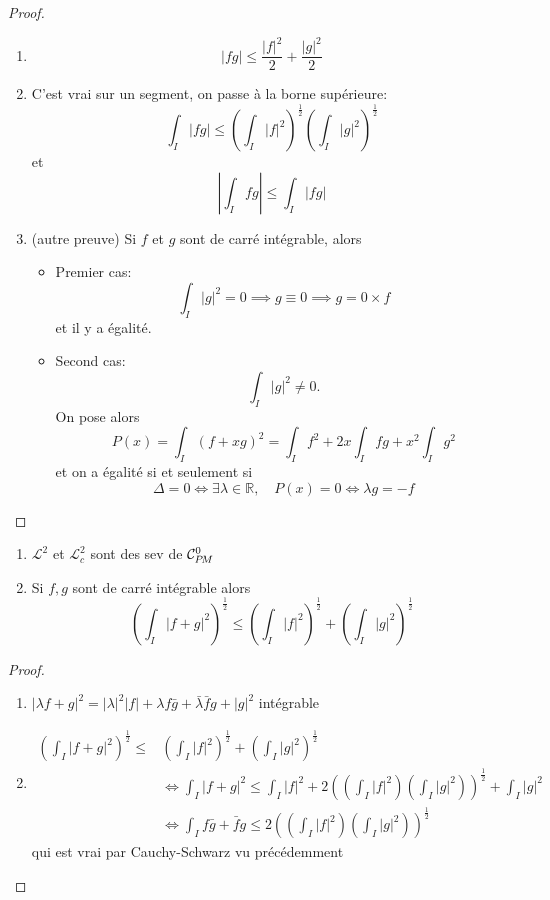 \begin{proof}~
    \begin{enumerate}
        \item  \[
                |fg|\leq \frac{|f|^2}2+\frac{|g|^2}2
            \]
        \item C'est vrai sur un segment, on passe à la borne supérieure: \[
                \int_I|fg|\leq \left( \int_I|f|^2 \right)^{\frac12} \left( \int_I|g|^2 \right)^{\frac12}
            \]
            et \[
                \left| \int_Ifg \right|\leq \int_I|fg|
            \]
        \item (autre preuve) Si $f$ et $g$ sont de carré intégrable, alors \begin{itemize}
            \item Premier cas: \[
                    \int_I|g|^2=0\implies g\equiv 0\implies g=0\times f
                \]
                et il y a égalité.
            \item Second cas: \[
                    \int_I|g|^2\neq 0.
                \]
                On pose alors \[
                    P(x)=\int_I(f+xg)^2=\int_If^2+2x\int_Ifg+x^2\int_Ig^2
                \]
                et on a égalité si et seulement si \[ \Delta=0\iff \exists \lambda\in\mathbb R, \quad P(x)=0\iff \lambda g=-f\]
        \end{itemize}
    \end{enumerate}
\end{proof}

\begin{thm}
    \begin{enumerate}
        \item $\mathcal L^2$ et $\mathcal L^2_c$ sont des sev de $\CPM$
        \item Si $f, g$ sont de carré intégrable alors \[
                \left( \int_I|f+g|^2 \right)^{\frac12}\leq \left( \int_I|f|^2 \right)^{\frac12}+ \left( \int_I|g|^2 \right)^{\frac12}
            \]
    \end{enumerate}
\end{thm}

\begin{proof}~
    \begin{enumerate}
        \item $|\lambda f+g|^2=|\lambda|^2|f|+\lambda f\bar g+\bar \lambda\bar fg+|g|^2$ intégrable
        \item \begin{align*}
                \left( \int_I|f+g|^2 \right)^{\frac12}\leq &\left( \int_I|f|^2 \right)^{\frac12}+ \left( \int_I|g|^2 \right)^{\frac12} \\&\iff \int_I|f+g|^2\leq \int_I|f|^2+2 \left( \left( \int_I|f|^2 \right) \left( \int_I|g|^2 \right) \right)^{\frac12}+\int_I|g|^2\\ &\iff \int_If\bar g+\bar fg\leq 2\left( \left( \int_I|f|^2 \right) \left( \int_I|g|^2 \right) \right)^{\frac12}
        \end{align*}
        qui est vrai par Cauchy-Schwarz vu précédemment
    \end{enumerate}
\end{proof}

